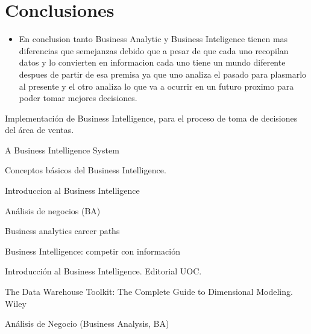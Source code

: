 \documentclass[twoside,twocolumn]{article}
\begin{document}


\section{Conclusiones}
\begin{itemize}	
	\item En conclusion tanto Business Analytic y Business Inteligence tienen mas diferencias que semejanzas debido que a pesar de que cada uno recopilan datos y lo convierten en
informacion cada uno tiene un mundo diferente despues de partir de esa premisa ya que uno analiza el pasado para plasmarlo al presente y el otro analiza lo que va a ocurrir en un futuro proximo para poder tomar mejores decisiones.

\end{itemize} 





\begin{thebibliography}{99} 

\newblock Implementación de Business Intelligence, para el proceso de toma de decisiones del área de ventas.

\newblock A Business Intelligence System

Conceptos básicos del Business Intelligence.

\newblock Introduccion al Business Intelligence

\newblock Análisis de negocios (BA)

\newblock Business analytics career paths

\newblock Business Intelligence: competir con información


\bibitem[Curto J., 2010]{} 
\newblock Introducción al Business Intelligence. Editorial UOC.

\newblock  The Data Warehouse Toolkit: The Complete Guide to Dimensional Modeling. Wiley

\bibitem[Carolina A., 2017]{} 
\newblock  Análisis de Negocio (Business Analysis, BA)
 
\end{thebibliography}


\end{document}
